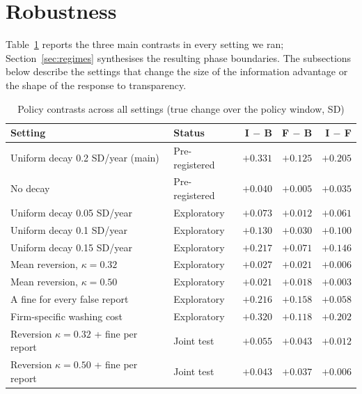 \documentclass[11pt]{article}
\begin{document}



\appendix

\section{Robustness}\label{app:robust}

Table~\ref{tab:robust} reports the three main contrasts in every setting we ran; Section~\ref{sec:regimes} synthesises the resulting phase boundaries. The subsections below describe the settings that change the size of the information advantage or the shape of the response to transparency.

\begin{table}[h]
\centering
\small
\begin{threeparttable}
\caption{Policy contrasts across all settings (true change over the policy window, SD)}
\label{tab:robust}
\begin{tabular}{@{}llrrr@{}}
\toprule
Setting & Status & I $-$ B & F $-$ B & I $-$ F \\
\midrule
Uniform decay 0.2 SD/year (main) & Pre-registered & $+0.331$ & $+0.125$ & $+0.205$ \\
No decay & Pre-registered & $+0.040$ & $+0.005$ & $+0.035$ \\
Uniform decay 0.05 SD/year & Exploratory & $+0.073$ & $+0.012$ & $+0.061$ \\
Uniform decay 0.1 SD/year & Exploratory & $+0.130$ & $+0.030$ & $+0.100$ \\
Uniform decay 0.15 SD/year & Exploratory & $+0.217$ & $+0.071$ & $+0.146$ \\
Mean reversion, $\kappa = 0.32$ & Exploratory & $+0.027$ & $+0.021$ & $+0.006$ \\
Mean reversion, $\kappa = 0.50$ & Exploratory & $+0.021$ & $+0.018$ & $+0.003$ \\
A fine for every false report & Exploratory & $+0.216$ & $+0.158$ & $+0.058$ \\
Firm-specific washing cost & Exploratory & $+0.320$ & $+0.118$ & $+0.202$ \\
Reversion $\kappa = 0.32$ + fine per report & Joint test & $+0.055$ & $+0.043$ & $+0.012$ \\
Reversion $\kappa = 0.50$ + fine per report & Joint test & $+0.043$ & $+0.037$ & $+0.006$ \\

\end{tabular}
\end{threeparttable}
\end{table}
\end{document}
